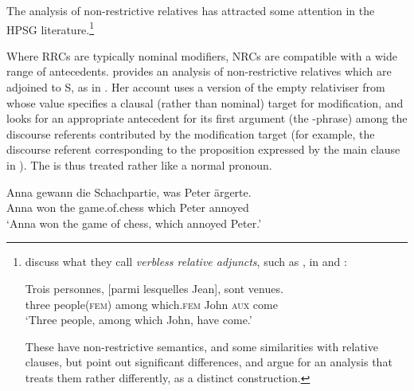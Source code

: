 \documentclass[output=paper
 	        ,biblatex
                ,babelshorthands
                ,newtxmath
                ,draftmode
                ,colorlinks, citecolor=brown
]{langscibook}
\begin{document}
The analysis of non-restrictive relatives has attracted some attention in the HPSG
literature.\footnote{\citet{BlbieLaurens09} discuss what they call \emph{verbless relative
  adjuncts}, such as , in  and :
\begin{exe}\ex\label{x:rc-111}
  \gll Trois personnes, [parmi lesquelles Jean], sont venues.\\
  three people(\textsc{fem}) \hphantom{[}among which.\textsc{fem} John \textsc{aux} come\\
  \glt `Three people, among which John, have come.’ 
\end{exe}
These have non-restrictive semantics, and some similarities with relative clauses, but
\citeauthor{BlbieLaurens09} point out significant differences, and argue for an analysis that
treats them rather differently, as a distinct construction.}

Where RRCs are typically nominal modifiers, NRCs are compatible with a wide range of
antecedents. \citet{Holler:03} provides an analysis of  non-restrictive relatives which are adjoined to S, as
in . Her account uses a version of the empty relativiser from \citet{Pollard:Sag:94} whose
 value specifies a clausal (rather than nominal) target for modification, and
looks for an appropriate antecedent for its first
argument (the -phrase) among
the discourse referents contributed by the modification target (for example, the discourse
referent corresponding to the proposition expressed by the main clause in ).
The  is thus treated rather like a normal pronoun.
\begin{exe}\ex\label{x:rc-112}
 \gll Anna gewann die Schachpartie, was Peter ärgerte.\\
      Anna won the game.of.chess which Peter annoyed \\
\glt `Anna won the game of chess, which annoyed Peter.' 
\end{exe}
\end{document}
